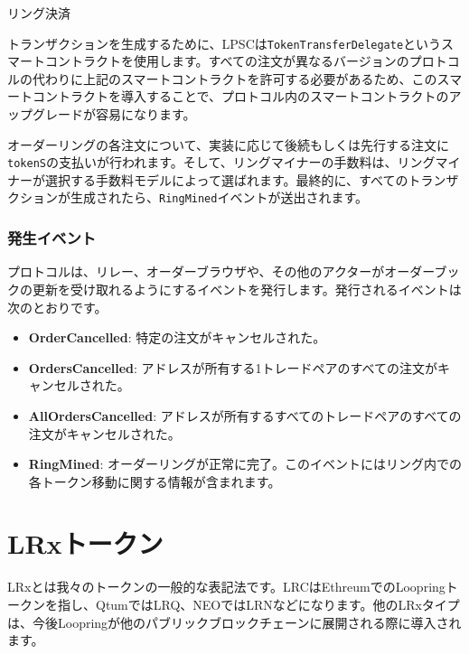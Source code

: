 \documentclass{article}
\makeatletter
\newenvironment{figurehere}
 {\def\@captype{figure}}
 {}
\makeatother
\begin{document}
\begin{multicols}{2}
\begin{center}
\begin{figurehere}
\caption{リング決済}
\label{fig:settlement}
\end{figurehere}
\end{center}

トランザクションを生成するために、LPSCは\verb|TokenTransferDelegate|というスマートコントラクトを使用します。すべての注文が異なるバージョンのプロトコルの代わりに上記のスマートコントラクトを許可する必要があるため、このスマートコントラクトを導入することで、プロトコル内のスマートコントラクトのアップグレードが容易になります。

オーダーリングの各注文について、実装に応じて後続もしくは先行する注文に\verb|tokenS|の支払いが行われます。そして、リングマイナーの手数料は、リングマイナーが選択する手数料モデルによって選ばれます。最終的に、すべてのトランザクションが生成されたら、\verb|RingMined|イベントが送出されます。

\subsubsection{発生イベント\label{sec:events}}

プロトコルは、リレー、オーダーブラウザや、その他のアクターがオーダーブックの更新を受け取れるようにするイベントを発行します。発行されるイベントは次のとおりです。

\begin{itemize}
	\item \textbf{OrderCancelled}: 特定の注文がキャンセルされた。
	\item \textbf{OrdersCancelled}: アドレスが所有する1トレードペアのすべての注文がキャンセルされた。
	\item \textbf{AllOrdersCancelled}: アドレスが所有するすべてのトレードペアのすべての注文がキャンセルされた。
	\item \textbf{RingMined}: オーダーリングが正常に完了。このイベントにはリング内での各トークン移動に関する情報が含まれます。
\end{itemize}


\section{LRxトークン\label{sec:token}}
LRxとは我々のトークンの一般的な表記法です。LRCはEthreumでのLoopringトークンを指し、QtumではLRQ、NEOではLRNなどになります。他のLRxタイプは、今後Loopringが他のパブリックブロックチェーンに展開される際に導入されます。


\end{multicols}
\end{document}
